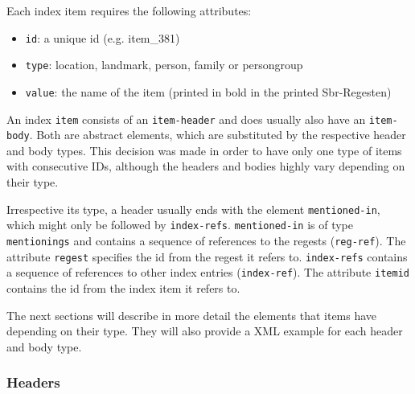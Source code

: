 Each index item requires the following attributes:
\begin{itemize}
\item \texttt{id}: a unique id (e.g. item\_381)
\item \texttt{type}: location, landmark, person, family or persongroup
\item \texttt{value}: the name of the item (printed in bold in the
  printed Sbr-Regesten)
\end{itemize}

An index \texttt{item} consists of an \texttt{item-header} and does
usually also have an \texttt{item-body}. Both are abstract elements,
which are substituted by the respective header and body types. This
decision was made in order to have only one type of items with
consecutive IDs, although the headers and bodies highly vary depending
on their type.

Irrespective its type, a header usually ends with the element
\texttt{mentioned-in}, which might only be followed by
\texttt{index-refs}. \texttt{mentioned-in} is of type
\texttt{mentionings} and contains a sequence of references to the
regests (\texttt{reg-ref}). The attribute \texttt{regest} specifies
the id from the regest it refers to. \texttt{index-refs} contains a
sequence of references to other index entries (\texttt{index-ref}).
The attribute \texttt{itemid} contains the id from the index item it
refers to.

The next sections will describe in more detail the elements that items
have depending on their type. They will also provide a XML example for
each header and body type.

\subsubsection{Headers}
\label{header-xml}

